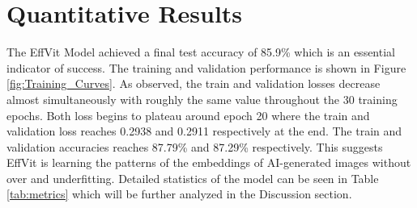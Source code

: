 \documentclass{article} %
\begin{document}


\section{Quantitative Results}
The EffVit Model achieved a final test accuracy of 85.9\% which is an essential indicator of success. The training and validation performance is shown in Figure \ref{fig:Training_Curves}. As observed, the train and validation losses decrease almost simultaneously with roughly the same value throughout the 30 training epochs. Both loss begins to plateau around epoch 20 where the train and validation loss reaches 0.2938 and 0.2911 respectively at the end. The train and validation accuracies reaches 87.79\% and 87.29\% respectively. This suggests EffVit is learning the patterns of the embeddings of AI-generated images without over and underfitting. Detailed statistics of the model can be seen in Table \ref{tab:metrics} which will be further analyzed in the Discussion section.
\end{document}
